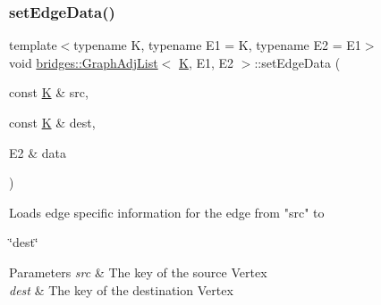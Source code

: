 \mbox{\label{classbridges_1_1_graph_adj_list_ac507940618b400d792c29b69fc9c7687}} 
\subsubsection{\texorpdfstring{setEdgeData()}{setEdgeData()}}
{\footnotesize\ttfamily template$<$typename K, typename E1 = K, typename E2 = E1$>$ \\
void \mbox{\hyperlink{classbridges_1_1_graph_adj_list}{bridges\+::\+Graph\+Adj\+List}}$<$ \mbox{\hyperlink{namespacebridges_acfb0a4f7877d8f63de3e6862004c50edaa5f3c6a11b03839d46af9fb43c97c188}{K}}, E1, E2 $>$\+::set\+Edge\+Data (\begin{DoxyParamCaption}\item[{const \mbox{\hyperlink{namespacebridges_acfb0a4f7877d8f63de3e6862004c50edaa5f3c6a11b03839d46af9fb43c97c188}{K}} \&}]{src,  }\item[{const \mbox{\hyperlink{namespacebridges_acfb0a4f7877d8f63de3e6862004c50edaa5f3c6a11b03839d46af9fb43c97c188}{K}} \&}]{dest,  }\item[{E2 \&}]{data }\end{DoxyParamCaption})\hspace{0.3cm}{\ttfamily [inline]}}

\begin{DoxyVerb}Loads edge specific information for the edge from "src" to
\end{DoxyVerb}
 \char`\"{}dest\char`\"{}


\begin{DoxyParams}{Parameters}
{\em src} & The key of the source Vertex \\
\hline
{\em dest} & The key of the destination Vertex \\
\hline
\end{DoxyParams}
\mbox{\label{classbridges_1_1_graph_adj_list_aa30a944a429e0422cbe0ddd7bdbd353b}} 
